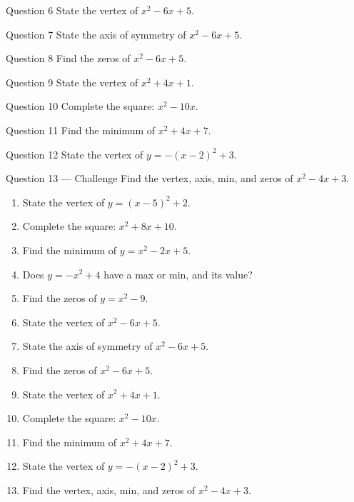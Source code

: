 \documentclass[11pt]{article}
\begin{document}
\begin{qbox}{Question 6}
State the vertex of $x^2-6x+5$.\workspace{2.4cm}
\end{qbox}

\begin{qbox}{Question 7}
State the axis of symmetry of $x^2-6x+5$.\workspace{2.4cm}
\end{qbox}

\begin{qbox}{Question 8}
Find the zeros of $x^2-6x+5$.\workspace{2.4cm}
\end{qbox}

\begin{qbox}{Question 9}
State the vertex of $x^2+4x+1$.\workspace{2.4cm}
\end{qbox}

\begin{qbox}{Question 10}
Complete the square: $x^2-10x$.\workspace{2.4cm}
\end{qbox}

\begin{qbox}{Question 11}
Find the minimum of $x^2+4x+7$.\workspace{2.4cm}
\end{qbox}

\begin{qbox}{Question 12}
State the vertex of $y=-(x-2)^2+3$.\workspace{2.4cm}
\end{qbox}

\begin{qbox}{Question 13 --- Challenge}
Find the vertex, axis, min, and zeros of $x^2-4x+3$.\workspace{3.5cm}
\end{qbox}

\clearpage
{}

\begin{recapbox}
\begin{multicols}{2}
\small
\begin{enumerate}[leftmargin=*,itemsep=3pt]
  \item State the vertex of $y=(x-5)^2+2$.
  \item Complete the square: $x^2+8x+10$.
  \item Find the minimum of $y=x^2-2x+5$.
  \item Does $y=-x^2+4$ have a max or min, and its value?
  \item Find the zeros of $y=x^2-9$.
  \item State the vertex of $x^2-6x+5$.
  \item State the axis of symmetry of $x^2-6x+5$.
  \item Find the zeros of $x^2-6x+5$.
  \item State the vertex of $x^2+4x+1$.
  \item Complete the square: $x^2-10x$.
  \item Find the minimum of $x^2+4x+7$.
  \item State the vertex of $y=-(x-2)^2+3$.
  \item Find the vertex, axis, min, and zeros of $x^2-4x+3$.
\end{enumerate}
\end{multicols}
\end{recapbox}
\end{document}
